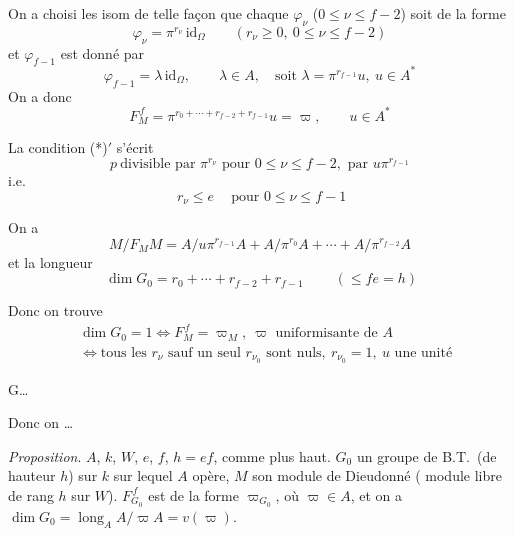\documentclass[11pt,a4paper]{article}
\begin{document}

On a choisi les isom de telle façon que chaque $\varphi_\nu$
($0 \le \nu \le f-2$) soit de la forme
\[
\varphi_\nu = \pi^{r_\nu}\, \mathrm{id}_{\Omega} \qquad
(r_\nu \geq 0, \ 0 \le \nu \le f-2)
\]
et $\varphi_{f-1}$ est donné par
\[
\varphi_{f-1} = \lambda\, \mathrm{id}_{\Omega}, \qquad \lambda \in A, \quad
\text{soit } \lambda = \pi^{r_{f-1}} u,\ u \in A^{*}
\]
\struck{\ill{}} On a donc
\[
F_M^{\,f} = \pi^{r_0 + \cdots + r_{f-2} + r_{f-1}} u = \varpi, \qquad u \in A^{*}
\]

La condition (*)$'$ s'écrit \struck{\ill{}} 
\[
p \ \text{divisible par } \pi^{r_\nu} \text{ pour } 0 \le \nu \le f-2,
\text{ par } u\pi^{r_{f-1}}
\]
i.e.
\[
\boxed{\ r_\nu \le e\ } \quad \text{pour } 0 \le \nu \le f-1
\]

On a
\[
M/F_M M = A/u\pi^{r_{f-1}}A + A/\pi^{r_0}A + \cdots + A/\pi^{r_{f-2}}A
\]
et \struck{\ill{}} la longueur 
\[
\boxed{\ \dim G_0 = r_0 + \cdots + r_{f-2} + r_{f-1}\ }
\qquad (\le fe = h)
\]


Donc on trouve
\[
\boxed{\begin{aligned}
&\dim G_0 = 1 \iff F_M^{\,f} = \varpi_M,\ \varpi \text{ uniformisante de } A \\
&\iff \text{tous les } r_\nu \text{ sauf un seul } r_{\nu_0} \text{ sont nuls},
\ r_{\nu_0} = 1,\ u \text{ une unité}
\end{aligned}}
\]

G\ldots{}


Donc  on  \ldots

\emph{Proposition}. $A$, $k$, $W$, $e$, $f$, $h = ef$, comme plus haut.
$G_0$ un groupe de B.T.\ (de hauteur $h$) sur $k$ sur lequel $A$ opère,
 $M$ son module de Dieudonné ( module libre de
rang $h$ sur $W$). $F_{G_0}^{\,f}$ est de la forme $\varpi_{G_0}$, où
$\varpi \in A$, et on a $\dim G_0 = \operatorname{long}_A A/\varpi A =
v(\varpi)$.
\end{document}
